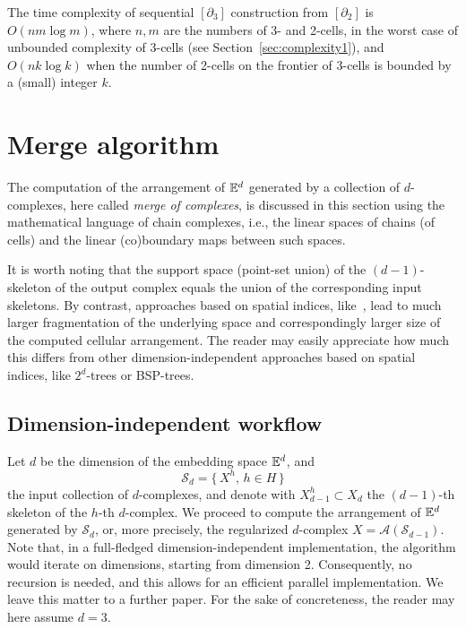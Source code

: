 The time complexity of sequential $[\partial_3]$ construction from $[\partial_2]$ is $O(n m\log m)$, where $n,m$ are the numbers of 3- and 2-cells,  in the worst case of unbounded complexity of $3$-cells (see Section~\ref{sec:complexity1}), and $O(n k\log k)$ when the number of 2-cells on the frontier of 3-cells is bounded by a (small) integer $k$.



\section{Merge algorithm}\label{merge-algorithm}

The computation of the arrangement of $\mathbb{E}^d$ 
generated by a collection of $d$-complexes, here called
\emph{merge of complexes}, is discussed in this section using the
mathematical language of chain complexes, i.e., the linear spaces of
chains (of cells) and the linear (co)boundary maps between such spaces.

It is worth noting that the support space (point-set union) of the $(d-1)$-skeleton of the output complex equals the union of the corresponding input skeletons. {By contrast, approaches based on spatial indices, like~\cite{Ayala:1985:ORM:3973.3975,Thibault:1987:SOP:37402.37421}, lead to much larger fragmentation of the underlying space and correspondingly larger size of the computed cellular arrangement.} The reader may easily appreciate how much this differs from other dimension-independent approaches based on spatial indices, like $2^d$-trees or BSP-trees. 

\subsection{Dimension-independent workflow}

Let $d$ be the dimension of the embedding space $\mathbb{E}^d$, and
\[
\mathcal{S}_d = \{\, X^h,\, h\in H\,\} 
\]
the input collection of $d$-complexes, and denote with $X^h_{d-1}\subset X_d$ the $(d-1)$-th
skeleton of the $h$-th $d$-complex. We proceed to compute the arrangement of $\mathbb{E}^d$ generated by $\mathcal{S}_d$, or, more precisely, the regularized $d$-complex $X=\mathcal{A}(\mathcal{S}_{d-1})$.
{Note that, in a full-fledged dimension-independent implementation, the algorithm would iterate on dimensions, starting from dimension 2. Consequently, no recursion is needed, and this allows for an efficient parallel implementation. We leave this matter to a further paper.}
For the sake of concreteness, the reader may here assume $d=3$. 


